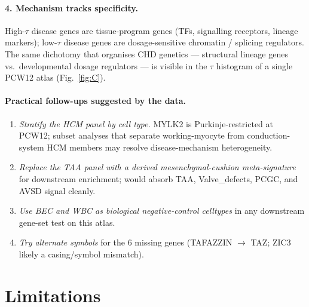 \documentclass[11pt,a4paper]{article}
\begin{document}
\paragraph{4. Mechanism tracks specificity.}
High-$\tau$ disease genes are tissue-program genes (TFs, signalling
receptors, lineage markers); low-$\tau$ disease genes are dosage-sensitive
chromatin / splicing regulators. The same dichotomy that organises CHD
genetics --- structural lineage genes vs.\ developmental dosage
regulators --- is visible in the $\tau$ histogram of a single PCW12
atlas (Fig.~\ref{fig:C}).

\paragraph{Practical follow-ups suggested by the data.}
\begin{enumerate}[leftmargin=*,itemsep=1pt]
    \item \emph{Stratify the HCM panel by cell type.} MYLK2 is
          Purkinje-restricted at PCW12; subset analyses that separate
          working-myocyte from conduction-system HCM members may resolve
          disease-mechanism heterogeneity.
    \item \emph{Replace the TAA panel with a derived
          mesenchymal-cushion meta-signature} for downstream enrichment;
          would absorb TAA, Valve\_defects, PCGC, and AVSD signal cleanly.
    \item \emph{Use BEC and WBC as biological negative-control celltypes}
          in any downstream gene-set test on this atlas.
    \item \emph{Try alternate symbols} for the 6 missing genes
          (TAFAZZIN $\to$ TAZ; ZIC3 likely a casing/symbol mismatch).
\end{enumerate}

\section{Limitations}
\label{sec:limitations}
\end{document}

